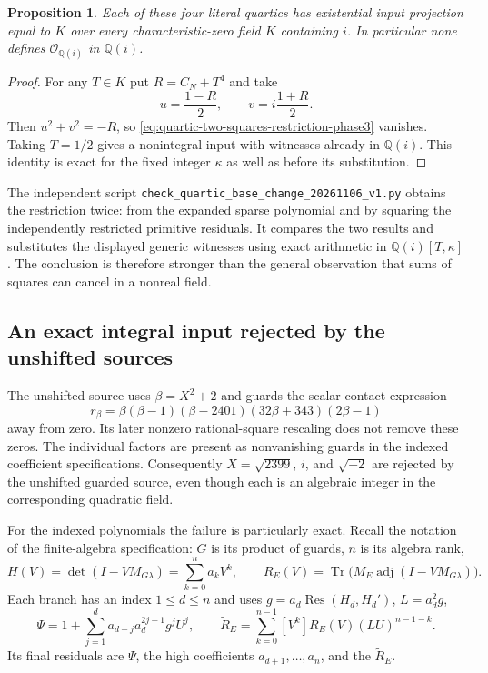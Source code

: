 \documentclass[11pt]{article}
\newtheorem{proposition}[theorem]{Proposition}
\theoremstyle{definition}
\begin{document}
\begin{proposition}\label{prop:quartic-collapse-Qi-phase3}
Each of these four literal quartics has existential input
projection equal to $K$ over every characteristic-zero field
$K$ containing $i$.  In particular none defines
$\mathcal O_{\mathbb Q(i)}$ in $\mathbb Q(i)$.
\end{proposition}
\begin{proof}
For any $T\in K$ put $R=C_N+T^4$ and take
\[
                         u=\frac{1-R}{2},\qquad
                         v=i\frac{1+R}{2}.
\]
Then $u^2+v^2=-R$, so
\eqref{eq:quartic-two-squares-restriction-phase3} vanishes.
Taking $T=1/2$ gives a nonintegral input with witnesses already
in $\mathbb Q(i)$.  This identity is exact for the fixed integer
$\kappa$ as well as before its substitution.
\end{proof}

The independent script
\nolinkurl{check_quartic_base_change_20261106_v1.py}
obtains the restriction twice: from the expanded sparse polynomial
and by squaring the independently restricted primitive residuals.
It compares the two results and substitutes the displayed generic
witnesses using exact arithmetic in
$\mathbb Q(i)[T,\kappa]$.  The conclusion is therefore stronger
than the general observation that sums of squares can cancel in a
nonreal field.

\subsection{An exact integral input rejected by the unshifted sources}

The unshifted source uses $\beta=X^2+2$ and guards the scalar
contact expression
\begin{equation}\label{eq:scalar-contact-polynomial-phase3}
       r_\beta=\beta(\beta-1)(\beta-2401)
                         (32\beta+343)(2\beta-1)
\end{equation}
away from zero.  Its later nonzero rational-square rescaling does
not remove these zeros.  The individual factors are present as
nonvanishing guards in the indexed coefficient specifications.
Consequently $X=\sqrt{2399}$, $i$, and $\sqrt{-2}$ are rejected
by the unshifted guarded source, even though each is an algebraic
integer in the corresponding quadratic field.

For the indexed polynomials the failure is particularly exact.
Recall the notation of the finite-algebra specification:
$G$ is its product of guards, $n$ is its algebra rank,
\[
 H(V)=\det(I-VM_{G\lambda})=\sum_{k=0}^n a_kV^k,
 \qquad
 R_E(V)=\operatorname{Tr}\bigl(M_E\operatorname{adj}
                       (I-VM_{G\lambda})\bigr).
\]
Each branch has an index $1\le d\le n$ and uses
$g=a_d\operatorname{Res}(H_d,H_d')$, $L=a_d^2g$,
\[
 \Psi=1+\sum_{j=1}^d a_{d-j}a_d^{2j-1}g^jU^j,
 \qquad
 \widetilde R_E=\sum_{k=0}^{n-1}[V^k]R_E(V)(LU)^{n-1-k}.
\]
Its final residuals are $\Psi$, the high coefficients
$a_{d+1},\ldots,a_n$, and the $\widetilde R_E$.
\end{document}
